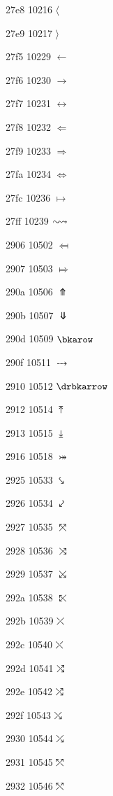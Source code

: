 \documentclass[11pt]{article}
\begin{document}
27e8 10216 \ensuremath{\langle}

27e9 10217 \ensuremath{\rangle}

27f5 10229 \ensuremath{\longleftarrow}

27f6 10230 \ensuremath{\longrightarrow}

27f7 10231 \ensuremath{\longleftrightarrow}

27f8 10232 \ensuremath{\Longleftarrow}

27f9 10233 \ensuremath{\Longrightarrow}

27fa 10234 \ensuremath{\Longleftrightarrow}

27fc 10236 \ensuremath{\longmapsto}

27ff 10239 \ensuremath{\sim\joinrel\leadsto}

2906 10502 \ensuremath{\Mapsfrom}

2907 10503 \ensuremath{\Mapsto}

290a 10506 \ensuremath{\Uuparrow}

290b 10507 \ensuremath{\Ddownarrow}

290d 10509 \ensuremath{\bkarow}

290f 10511 \ensuremath{\dbkarow}

2910 10512 \ensuremath{\drbkarrow}

2912 10514 \ensuremath{\UpArrowBar}

2913 10515 \ensuremath{\DownArrowBar}

2916 10518 \ensuremath{\twoheadrightarrowtail}

2925 10533 \ensuremath{\hksearow}

2926 10534 \ensuremath{\hkswarow}

2927 10535 \ensuremath{\tona}

2928 10536 \ensuremath{\toea}

2929 10537 \ensuremath{\tosa}

292a 10538 \ensuremath{\towa}

292b 10539 \ensuremath{\rdiagovfdiag}

292c 10540 \ensuremath{\fdiagovrdiag}

292d 10541 \ensuremath{\seovnearrow}

292e 10542 \ensuremath{\neovsearrow}

292f 10543 \ensuremath{\fdiagovnearrow}

2930 10544 \ensuremath{\rdiagovsearrow}

2931 10545 \ensuremath{\neovnwarrow}

2932 10546 \ensuremath{\nwovnearrow}
\end{document}
